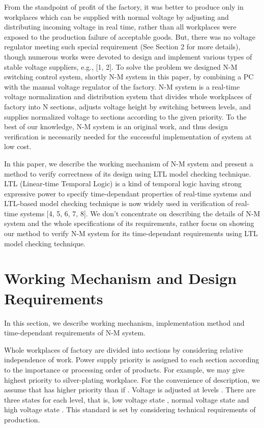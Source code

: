\documentclass[runningheads,a4paper]{llncs}
\begin{document}
From the standpoint of profit of the factory, it was better to produce only in workplaces which can be supplied with normal voltage by adjusting and distributing incoming voltage in real time, rather than all workplaces were exposed to the production failure of acceptable goods. But, there was no voltage regulator meeting such special requirement (See Section 2 for more details), though numerous works were devoted to design and implement various types of stable voltage suppliers, e.g., [1, 2]. To solve the problem we designed N-M switching control system, shortly N-M system in this paper, by combining a PC with the manual voltage regulator of the factory.
N-M system is a real-time voltage normalization and distribution system that divides whole workplaces of factory into N sections, adjusts voltage height by switching between  levels, and supplies normalized voltage to sections according to the given priority. To the best of our knowledge, N-M system is an original work, and thus design verification is necessarily needed for the successful implementation of system at low cost. 

In this paper, we describe the working mechanism of N-M system and present a method to verify correctness of its design using LTL model checking technique. LTL (Linear-time Temporal Logic) is a kind of temporal logic having strong expressive power to specify time-dependant properties of real-time systems and LTL-based model checking technique is now widely used in verification of real-time systems [4, 5, 6, 7, 8]. We don’t concentrate on describing the details of N-M system and the whole specifications of its requirements, rather focus on showing our method to verify N-M system for its time-dependant requirements using LTL model checking technique. 

\section{Working Mechanism and Design Requirements}

In this section, we describe working mechanism, implementation method and time-dependant requirements of N-M system.

Whole workplaces of factory are divided into  sections  by considering relative independence of work. Power supply priority is assigned to each section according to the importance or processing order of products. For example, we may give highest priority to silver-plating workplace. For the convenience of description, we assume that  has higher priority than  if . Voltage is adjusted at  levels . There are three states for each level, that is, low voltage state , normal voltage state  and high voltage state . This standard is set by considering technical requirements of production.
\end{document}
